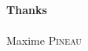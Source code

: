 
\thispagestyle{empty}	%


\begin{center}
	\LARGE{\textbf{Thanks}}\\[1cm]
\end{center}

\linespread{1.13}


\large{ \paragraph{} 

}


\large{ \paragraph{} 

}


\large{ \paragraph{} 

}



\begin{flushright} 
	Maxime \textsc{Pineau}\\
\end{flushright}


\newpage
